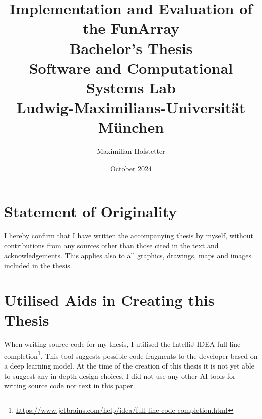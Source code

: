 \documentclass{report}
\title{Implementation and Evaluation of the FunArray\\[1em]\large{}Bachelor's Thesis\\[1em]Software and Computational Systems Lab\\Ludwig-Maximilians-Universit\"at M\"unchen}
\date{October 2024}
\author{Maximilian Hofstetter}
\begin{document}
\section*{Statement of Originality}
\thispagestyle{empty}
I hereby confirm that I have written the accompanying thesis by myself, without contributions from any sources other than those cited in the text and acknowledgements. This applies also to all graphics, drawings, maps and images included in the thesis.

\section*{Utilised Aids in Creating this Thesis}

When writing source code for my thesis, I utilised the IntelliJ IDEA full line completion\footnote{\url{https://www.jetbrains.com/help/idea/full-line-code-completion.html}}. This tool suggests possible code fragments to the developer based on a deep learning model. At the time of the creation of this thesis it is not yet able to suggest any in-depth design choices. I did not use any other AI tools for writing source code nor text in this paper.

\maketitle
\setcounter{tocdepth}{1}
\tableofcontents







\newpage


\end{document}
